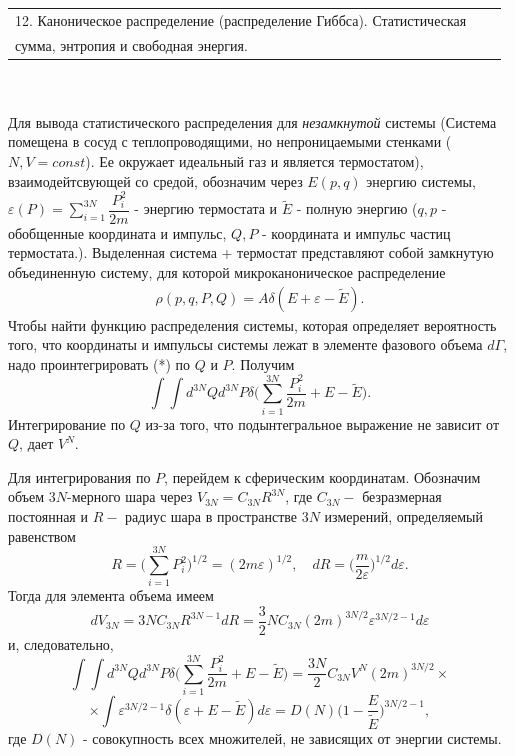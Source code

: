\documentclass[14pt,a4paper]{scrartcl}
\begin{document}
  	 \begin{tabular}[t]{|l|ll|} 
  	\hline
  	  12. Каноническое распределение (распределение Гиббса). Статистическая\\
  	сумма, энтропия и свободная энергия.\\
  	\hline
  \end{tabular}\\\\

  
  \quad Для вывода статистического распределения для \textit{незамкнутой} системы (Система помещена в сосуд с теплопроводящими, но непроницаемыми стенками ($N, V = const$). Ее окружает идеальный газ и является термостатом), взаимодейтсвующей со средой, обозначим через  $E(p,q)$ энергию системы, $\varepsilon(P) = \sum\limits_{i=1}^{3 N} \dfrac{P_i^2}{2m}$ - энергию термостата и $\widetilde{E}$ - полную энергию ($q,p$ - обобщенные координата и импульс, $Q, P$ - координата и импульс частиц термостата.).
  \quad Выделенная система + термостат представляют собой замкнутую объединенную систему, для которой микроканоническое распределение 
  \begin{align}
  \rho(p,q,P,Q) = A\delta(E +\varepsilon -\widetilde{E}).\tag{*}
  \end{align}
  Чтобы найти функцию распределения системы, которая определяет вероятность того, что координаты и импульсы системы лежат в элементе фазового объема $d\Gamma$, надо проинтегрировать (*) по $Q$ и $P$.  Получим 
  $$\int\int d^{3N}Q d^{3N} P\delta\biggl(\sum\limits_{i=1}^{3 N} \dfrac{P_i^2}{2m} +E - \widetilde{E}\biggr).$$
  Интегрирование по $Q$ из-за того, что подынтегральное выражение не зависит от $Q$, дает $V^{N}$.
  
  \quad Для интегрирования по $P$, перейдем к сферическим координатам. Обозначим объем $3N$-мерного шара через $V_{3N} = C_{3N}R^{3N}$, где $C_{3N} - $ безразмерная постоянная и $R - $ радиус шара в пространстве $3N$ измерений, определяемый равенством 
  $$R = \biggl(\sum\limits_{i=1}^{3N}P_i^2\biggr)^{1/2} = (2m\varepsilon)^{1/2}, \quad dR = \biggl(\frac{m}{2\varepsilon}\biggr)^{1/2}d\varepsilon.$$
  Тогда для элемента объема имеем 
  $$dV_{3N} = 3NC_{3N}R^{3N-1}dR = \dfrac{3}{2}NC_{3N}(2m)^{3N/2}\varepsilon^{3N/2 - 1}d\varepsilon$$
  и, следовательно,
  $$\int\int d^{3N}Qd^{3N}P\delta\biggl(\sum\limits_{i=1}^{3 N} \dfrac{P_i^2}{2m} +E - \widetilde{E}\biggr) = \dfrac{3N}{2}C_{3N}V^N(2m)^{3N/2}\times$$
  $$\times\int\varepsilon^{3N/2 -1}\delta(\varepsilon + E -\widetilde{E})d\varepsilon = D(N)\biggl(1-\dfrac{E}{\widetilde{E}}\biggr)^{3N/2-1},$$
  где $D(N)$ - совокупность всех множителей, не зависящих от энергии системы.
  
\end{document}
